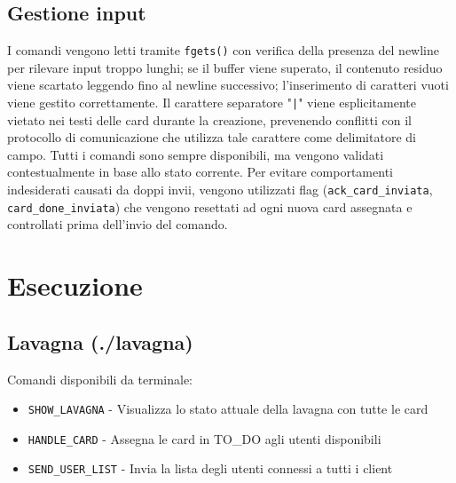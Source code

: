 \documentclass[a4paper,11pt]{article}
\begin{document}
\subsection*{Gestione input}
I comandi vengono letti tramite \texttt{fgets()} con verifica della presenza del newline 
per rilevare input troppo lunghi; se il buffer viene superato, il contenuto residuo viene scartato leggendo fino al newline successivo;
l'inserimento di caratteri vuoti viene gestito correttamente. 
Il carattere separatore "\texttt{|}" viene esplicitamente vietato nei testi delle card durante la creazione, prevenendo conflitti con il 
protocollo di comunicazione che utilizza tale carattere come delimitatore di campo. Tutti i comandi sono sempre disponibili, ma vengono validati contestualmente 
in base allo stato corrente. 
Per evitare comportamenti indesiderati causati da doppi invii, vengono utilizzati flag (\texttt{ack\_card\_inviata}, \texttt{card\_done\_inviata}) che vengono resettati ad ogni nuova card assegnata 
e controllati prima dell'invio del comando.

\section*{Esecuzione}
\subsection*{Lavagna    (./lavagna)}
Comandi disponibili da terminale:
\begin{itemize}
    \item \texttt{SHOW\_LAVAGNA} - Visualizza lo stato attuale della lavagna con tutte le card
    \item \texttt{HANDLE\_CARD} - Assegna le card in TO\_DO agli utenti disponibili
    \item \texttt{SEND\_USER\_LIST} - Invia la lista degli utenti connessi a tutti i client
\end{itemize}
\end{document}
